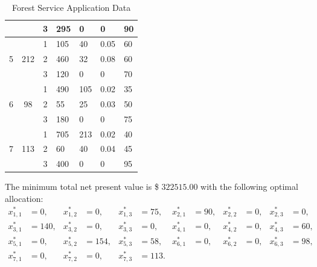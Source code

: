 \documentclass[a4paper,10 pt,titlepage,twoside]{book}
\theoremstyle{plain}
\theoremstyle{definition}
\theoremstyle{remark}
\begin{document}
\begin{table}[]
\begin{tabular}{cccllll}
		&  & 3 & 295 & 0 & 0 & 90 \\ \hline
		\multirow{3}{*}{5} & \multirow{3}{*}{212} & 1 & 105 & 40 & 0.05 & 60 \\
		&  & 2 & 460 & 32 & 0.08 & 60 \\
		&  & 3 & 120 & 0 & 0 & 70 \\ \hline
		\multirow{3}{*}{6} & \multirow{3}{*}{98} & 1 & 490 & 105 & 0.02 & 35 \\
		&  & 2 & 55 & 25 & 0.03 & 50 \\
		&  & 3 & 180 & 0 & 0 & 75 \\ \hline
		\multirow{3}{*}{7} & \multirow{3}{*}{113} & 1 & 705 & 213 & 0.02 & 40 \\
		&  & 2 & 60 & 40 & 0.04 & 45 \\
		&  & 3 & 400 & 0 & 0 & 95 \\ \hline
	\end{tabular}\caption{\label{table:timber}Forest Service Application Data}
\end{table}

The minimum total net present value is \$ $322515.00$ with the following optimal allocation:
\begin{align*}
x_{1,1}^{*} &=  0, & x_{1,2}^{*}&= 0, & x_{1,3}^{*} &= 75, & x_{2,1}^{*} &= 90, & x_{2,2}^{*} &= 0, & x_{2,3}^{*} &= 0,\\
x_{3,1}^{*} &= 140, & x_{3,2}^{*}&= 0, & x_{3,3}^{*} &= 0, & x_{4,1}^{*} &= 0, & x_{4,2}^{*} &= 0, & x_{4,3}^{*} &= 60,\\
x_{5,1}^{*} &= 0, & x_{5,2}^{*}&= 154, & x_{5,3}^{*} &= 58, & x_{6,1}^{*} &= 0, & x_{6,2}^{*} &= 0, & x_{6,3}^{*} &= 98,\\
 x_{7,1}^{*}&= 0,&x_{7,2}^{*} &= 0, & x_{7,3}^{*} &= 113. & & & &  & & \\
\end{align*}
\end{document}

